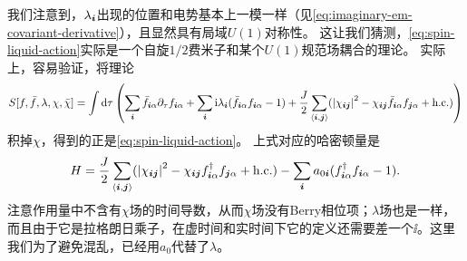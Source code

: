 我们注意到，$\lambda_{\vb*{i}}$出现的位置和电势基本上一模一样（见\eqref{eq:imaginary-em-covariant-derivative}），且显然具有局域$U(1)$对称性。
这让我们猜测，\eqref{eq:spin-liquid-action}实际是一个自旋$1/2$费米子和某个$U(1)$规范场耦合的理论。
实际上，容易验证，将理论
\begin{equation}
    S[f, \bar{f}, \lambda, \chi, \bar{\chi}] = \int \dd{\tau} \left( \sum_{\vb*{i}} \bar{f}_{\vb*{i} \alpha} \partial_\tau f_{\vb*{i} \alpha} + \sum_{\vb*{i}} \mathrm{i} \lambda_{\vb*{i}} (\bar{f}_{\vb*{i} \alpha} f_{\vb*{i} \alpha} - 1) + \frac{J}{2} \sum_{\langle \vb*{i}, \vb*{j} \rangle} (\abs{\chi_{\vb*{i} \vb*{j}}}^2 - \chi_{\vb*{i} \vb*{j}} \bar{f}_{\vb*{i} \alpha} f_{\vb*{j} \alpha} + \text{h.c.}) \right)
\end{equation}
积掉$\chi$，得到的正是\eqref{eq:spin-liquid-action}。
上式对应的哈密顿量是
\begin{equation}
    H = \frac{J}{2} \sum_{\langle \vb*{i}, \vb*{j} \rangle} (\abs{\chi_{\vb*{i} \vb*{j}}}^2 - \chi_{\vb*{i} \vb*{j}} {f}^\dagger_{\vb*{i} \alpha} f_{\vb*{j} \alpha} + \text{h.c.}) - \sum_{\vb*{i}} a_{0 \vb*{i}} (f^\dagger_{\vb*{i} \alpha} f_{\vb*{i} \alpha} - 1).
    \label{eq:simplest-heisenberg-u-1-hamiltonian}
\end{equation}
注意作用量中不含有$\chi$场的时间导数，从而$\chi$场没有Berry相位项；$\lambda$场也是一样，而且由于它是拉格朗日乘子，在虚时间和实时间下它的定义还需要差一个$\ii$。这里我们为了避免混乱，已经用$a_0$代替了$\lambda$。

